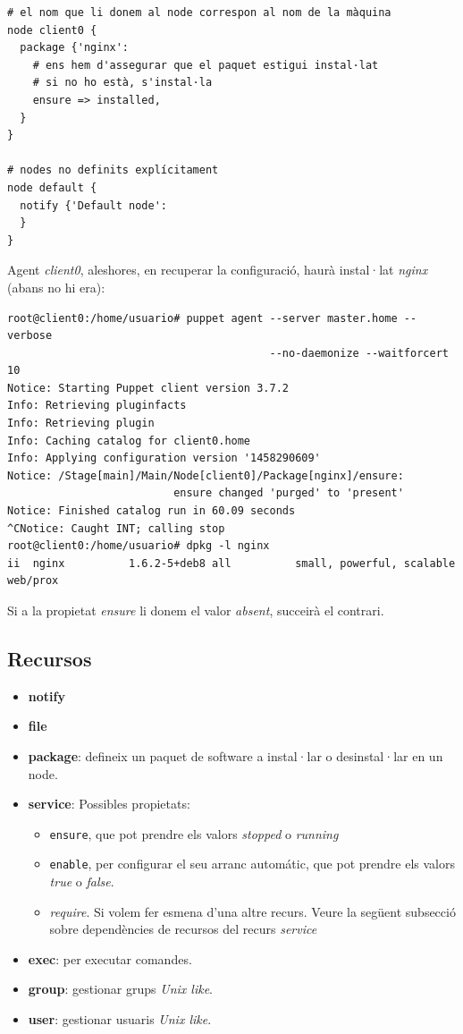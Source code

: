 \documentclass[a4paper]{article}
\begin{document}
\begin{verbatim}
# el nom que li donem al node correspon al nom de la màquina
node client0 {
  package {'nginx':
    # ens hem d'assegurar que el paquet estigui instal·lat
    # si no ho està, s'instal·la
    ensure => installed,
  }  	
}

# nodes no definits explícitament
node default {
  notify {'Default node':
  }
}
\end{verbatim}
Agent \textit{client0}, aleshores, en recuperar la configuració, haurà instal·lat \textit{nginx} (abans no hi era):
\begin{verbatim}
root@client0:/home/usuario# puppet agent --server master.home --verbose 
                                         --no-daemonize --waitforcert 10
Notice: Starting Puppet client version 3.7.2
Info: Retrieving pluginfacts
Info: Retrieving plugin
Info: Caching catalog for client0.home
Info: Applying configuration version '1458290609'
Notice: /Stage[main]/Main/Node[client0]/Package[nginx]/ensure: 
                          ensure changed 'purged' to 'present'
Notice: Finished catalog run in 60.09 seconds
^CNotice: Caught INT; calling stop
root@client0:/home/usuario# dpkg -l nginx
ii  nginx          1.6.2-5+deb8 all          small, powerful, scalable web/prox
\end{verbatim}
Si a la propietat \textit{ensure} li donem el valor \textit{absent}, succeirà el contrari.
\subsection{Recursos}
\begin{itemize}
	\item \textbf{notify}
	\item \textbf{file}
	\item \textbf{package}: defineix un paquet de software a instal·lar o desinstal·lar en un node.
	\item \textbf{service}: Possibles propietats:
		\begin{itemize}
			\item \verb+ensure+, que pot prendre els valors \textit{stopped} o \textit{running}
			\item \verb+enable+, per configurar el seu arranc automátic, que pot prendre els valors \textit{true} o \textit{false}.
			\item \textit{require}. Si volem fer esmena d'una altre recurs. Veure la següent subsecció sobre dependències de recursos del recurs \textit{service}
		\end{itemize}
	\item \textbf{exec}: per executar comandes.
	\item \textbf{group}: gestionar grups \textit{Unix like}.
	\item \textbf{user}: gestionar usuaris \textit{Unix like}.
\end{itemize}
\end{document}
